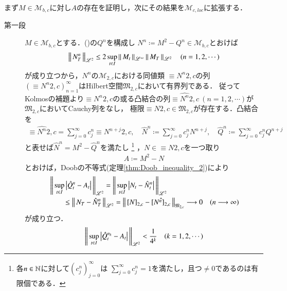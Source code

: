 	\begin{prf}
		まず$M \in \mathcal{M}_{b,c}$に対し$A$の存在を証明し，次にその結果を$\mathcal{M}_{c,loc}$に拡張する．
		\begin{description}
			\item[第一段]
				$M \in \mathcal{M}_{b,c}$とする．()の$Q^n$を構成し
				$N^n \coloneqq M^2 - Q^n \in \mathcal{M}_{b,c}$とおけば
				\begin{align}
					\left\|\, N_T^n\, \right\|_{\mathscr{L}^2} \leq 2 \operatorname*{sup}_{t \in I} \left\|\, M_t\, \right\|_{\mathscr{L}^\infty} \left\|\, M_T\, \right\|_{\mathscr{L}^2} \quad (n=1,2,\cdots)
				\end{align}
				が成り立つから，$N^n$の$\mathcal{M}_{2,c}$における同値類
				$\equiv{N^n}{2,c}$の列$\left( \equiv{N^n}{2,c} \right)_{n=1}^{\infty}$はHilbert空間$\mathfrak{M}_{2,c}$において有界列である．
				従ってKolmosの補題より$\equiv{N^n}{2,c}$の或る凸結合の列$\hat{\equiv{N^n}{2,c}}\ (n=1,2,\cdots)$が$\mathfrak{M}_{2,c}$においてCauchy列をなし，
				極限$\equiv{N}{2,c} \in \mathfrak{M}_{2,c}$が存在する．凸結合を
				\begin{align}
					\hat{\equiv{N^n}{2,c}} = \sum_{j=0}^{\infty} c^n_j \equiv{N^{n+j}}{2,c}, \quad
					\hat{N}^n \coloneqq \sum_{j=0}^{\infty} c^n_j N^{n+j}, \quad
					\hat{Q}^n \coloneqq \sum_{j=0}^{\infty} c^n_j Q^{n+j}
				\end{align}
				と表せば$\hat{N}^n = M^2 - \hat{Q}^n$を満たし
				\footnote{
					各$n \in \mathbb{N}$に対して$(c^n_j)_{j=0}^{\infty}$は
					$\sum_{j=0}^{\infty} c^n_j = 1$を満たし，且つ$\neq 0$であるのは有限個である．
				}
				，$N \in \equiv{N}{2,c}$を一つ取り
				\begin{align}
					A \coloneqq M^2 - N \label{eq:thm_quadratic_variation_0}
				\end{align}
				とおけば，Doobの不等式(定理\ref{thm:Doob_inequality_2})により
				\begin{align}
					&\left\|\, \operatorname*{sup}_{t \in I} \left| \hat{Q}_t^n - A_t \right|\, \right\|_{\mathscr{L}^2}
					= \left\|\, \operatorname*{sup}_{t \in I} \left| N_t - \hat{N}_t^n \right|\, \right\|_{\mathscr{L}^2} \\
					&\qquad \leq \left\|\, N_T - \hat{N}_T^n\, \right\|_{\mathscr{L}^2}
					= \left\|\, \left[N\right]_{2,c} - \hat{\left[N^n\right]_{2,c}}\, \right\|_{\mathfrak{M}_{2,c}} \longrightarrow 0 \quad (n \longrightarrow \infty) 
				\end{align}
				が成り立つ．
				\begin{align}
					\left\|\, \operatorname*{sup}_{t \in I} \left| \hat{Q}_t^{n_k} - A_t \right|\, \right\|_{\mathscr{L}^2} < \frac{1}{4^k} \quad (k=1,2,\cdots)
				\end{align}

\end{description}
\end{prf}
